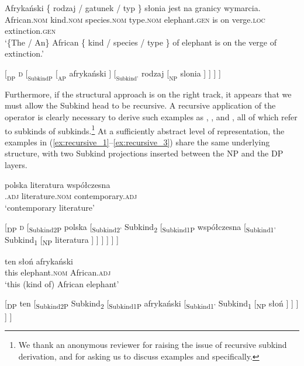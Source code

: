 \documentclass[output=paper]{langscibook}
\begin{document}
\ea \gll
Afrykański \{ rodzaj / gatunek / typ \} słonia jest na granicy wymarcia.\\
African.\textsc{nom} { } kind.\textsc{nom} { } species.\textsc{nom} { } type.\textsc{nom} { } elephant.\textsc{gen} is on verge.\textsc{loc} extinction.\textsc{gen}\\
\glt `\{The / An\} African \{ kind / species / type \} of elephant is on the verge of extinction.'
\label{ex:kind_head}
\z

\ea $[_\text{DP}$ \textsc{d} $[_\text{SubkindP}$ $[_\text{AP}$ afrykański $]$ $[_\text{Subkind'}$ rodzaj $[_\text{NP}$ slonia ] ] ] ]
\label{ex:structure_2}
\z

\noindent
Furthermore, if the structural approach is on the right track, it appears that we must allow the Subkind head to be recursive. A recursive application of the  operator is clearly necessary to derive such examples as , , and , all of which refer to subkinds of subkinds.\footnote{We thank an anonymous reviewer for raising the issue of recursive subkind derivation, and for asking us to discuss examples  and  specifically.} At a sufficiently abstract level of representation, the examples in (\ref{ex:recursive_1}--\ref{ex:recursive_3}) share the same underlying structure, with two Subkind projections inserted between the NP and the DP layers.

\ea \label{ex:recursive_1}
\ea \gll
polska literatura współczesna\\
.\textsc{adj} literature.\textsc{nom} contemporary.\textsc{adj}\\
\glt `contemporary  literature'

\ex
{}[\textsubscript{DP} \textsc{d} [\textsubscript{Subkind2P} polska [\textsubscript{Subkind2'} Subkind\textsubscript{2} [\textsubscript{Subkind1P} współczesna [\textsubscript{Subkind1'} Subkind\textsubscript{1} [\textsubscript{NP} literatura ] ] ] ] ] ]
\z \z

\ea \label{ex:recursive_2}
\ea \gll
ten słoń afrykański\\
this elephant.\textsc{nom} African.\textsc{adj}\\
\glt `this (kind of) African elephant'

\ex
{}[\textsubscript{DP} ten [\textsubscript{Subkind2P} Subkind\textsubscript{2} [\textsubscript{Subkind1P} afrykański [\textsubscript{Subkind1'} Subkind\textsubscript{1} [\textsubscript{NP} słoń ] ] ] ] ]
\z \z
\end{document}
